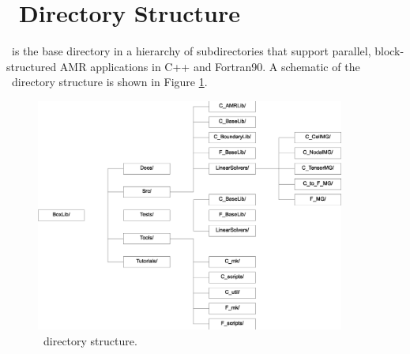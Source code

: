 \section{\BoxLib\ Directory Structure}

\BoxLib\ is the base directory in a hierarchy of subdirectories that
support parallel, block-structured AMR applications in C++ and Fortran90.
A schematic of the \BoxLib\ directory structure is shown in Figure 
\ref{fig:boxlib_directory}.
\begin{figure}[tb]
\centering
\includegraphics[width=4in]{./Introduction/boxlib_directory_bw2}
\caption{\label{fig:boxlib_directory}\BoxLib\ directory structure.}
\end{figure}

